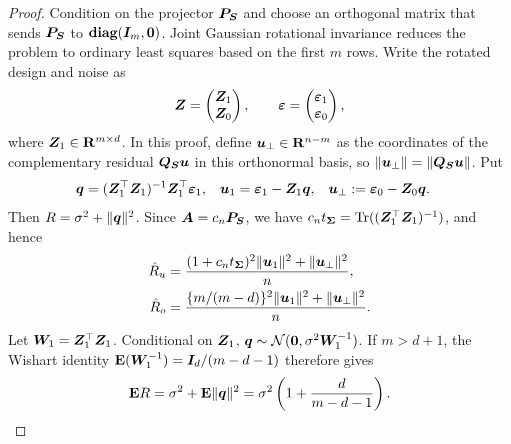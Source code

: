 \documentclass{article}
\theoremstyle{plain} %
\theoremstyle{definition} %
\theoremstyle{definition} %
\newcommand{\hR}{\hat{R}}
\begin{document}
\begin{proof}
Condition on the projector $\boldsymbol{P}_{\boldsymbol{S}}$ and choose an orthogonal matrix that sends
$\boldsymbol{P}_{\boldsymbol{S}}$ to $\operatorname{\mathbf{diag}}(\boldsymbol{I}_m,\mathbf{0})$.  Joint Gaussian rotational invariance
reduces the problem to ordinary least squares based on the first $m$ rows.
Write the rotated design and noise as
\begin{align*}
    \boldsymbol{Z}=\begin{pmatrix}\boldsymbol{Z}_1\\\boldsymbol{Z}_0\end{pmatrix},
    \qquad
    {\boldsymbol{\varepsilon} }=\begin{pmatrix}{\boldsymbol{\varepsilon} }_1\\{\boldsymbol{\varepsilon} }_0\end{pmatrix},
\end{align*}
where $\boldsymbol{Z}_1\in{\mathbf{R}}^{m\times d}$.      In this proof, define
$\boldsymbol{u}_\perp\in{\mathbf{R}}^{n-m}$ as the coordinates of the complementary residual
$\boldsymbol{Q}_{\boldsymbol{S}}\boldsymbol{u}$ in this orthonormal basis, so
$\lVert\boldsymbol{u}_\perp\rVert=\lVert\boldsymbol{Q}_{\boldsymbol{S}}\boldsymbol{u}\rVert$. Put 
\begin{align*}
    \boldsymbol{q}&=(\boldsymbol{Z}_1^\top\boldsymbol{Z}_1)^{-1}\boldsymbol{Z}_1^\top{\boldsymbol{\varepsilon} }_1,
    & \boldsymbol{u}_1&={\boldsymbol{\varepsilon} }_1-\boldsymbol{Z}_1\boldsymbol{q},
    &
    \boldsymbol{u}_\perp&:={\boldsymbol{\varepsilon} }_0-\boldsymbol{Z}_0\boldsymbol{q}.
\end{align*}
Then $R=\sigma^2+\lVert\boldsymbol{q}\rVert^2$.  Since $\boldsymbol{A}=c_n\boldsymbol{P}_{\boldsymbol{S}}$, we have
$c_nt_{\boldsymbol{\Sigma}}=\operatorname{Tr}((\boldsymbol{Z}_1^\top\boldsymbol{Z}_1)^{-1})$, and hence
\begin{align*}
    \hR_u
    &=\frac{(1+c_nt_{\bSigma})^2\norm{\bu_1}^2+\norm{\bu_\perp}^2}{n},\\
    \hR_o
    &=\frac{\{m/(m-d)\}^2\norm{\bu_1}^2+\norm{\bu_\perp}^2}{n}.
\end{align*}
Let $\boldsymbol{W}_1=\boldsymbol{Z}_1^\top\boldsymbol{Z}_1$.  Conditional on $\boldsymbol{Z}_1$,
$\boldsymbol{q}\sim{\mathcal N}(\mathbf{0},\sigma^2\boldsymbol{W}_1^{-1})$.  If $m>d+1$, the Wishart
identity ${\mathbf{E}}(\boldsymbol{W}_1^{-1})=\boldsymbol{I}_d/(m-d-1)$ therefore gives
\begin{align}
    {\mathbf{E}} R
    =\sigma^2+{\mathbf{E}}\lVert\boldsymbol{q}\rVert^2
    =\sigma^2\left(1+\frac{d}{m-d-1}\right).
    \label{eq:tight-frame-exact-risk}
\end{align}


\end{proof}
\end{document}
